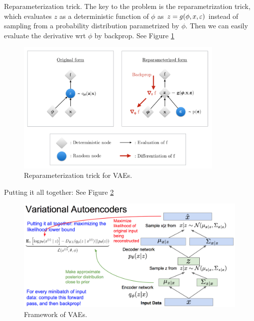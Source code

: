 \documentclass[english]{article}
\begin{document}









\item 
Reparameterization trick. The key to the problem is the reparametrization trick, which evaluates $z$ as a deterministic function of $\phi$ as $z = g(\phi,x,\varepsilon)$ instead of sampling from a probability distribution parametrized by $\phi$. Then we can easily evaluate the derivative wrt $\phi$ by backprop. See Figure \ref{Reparam}


\begin{figure}[H]\centering
\includegraphics[width=10cm]{Reparam}
\caption{Reparameterization trick for VAEs.}
\label{Reparam}
\end{figure}

Putting it all together: See Figure \ref{VAE_Process}

\begin{figure}[H]\centering
\includegraphics[width=12cm]{VAE_Process}
\caption{Framework of VAEs.}
\label{VAE_Process}
\end{figure}
\end{document}
